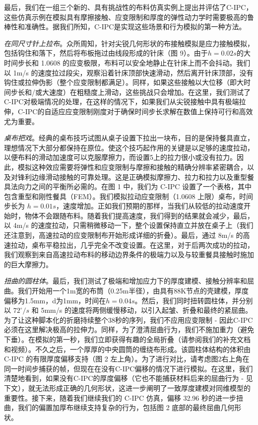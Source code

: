 最后，我们在一组三个新的、具有挑战性的布料仿真实例上提出并评估了C-IPC，这些仿真示例在模拟具有摩擦接触、应变限制和厚度的弹性动力学时需要极高的鲁棒性和准确性。据我们所知，C-IPC是实现这些场景和行为模拟的第一种方法。

\textit{在同尺寸针上拉布}。众所周知，针对尖锐几何形状的布接触模拟是应力接触模拟，包括钩住和落下，然后将布板拖过由线段形成的针床（图 9）。由于$h = 0.02s$的大时间步长和 1.0608 的应变极限，布料可以安全地静止在针床上而不会抖动。我们以 1m/s 的速度拉过段尖，观察沿着针床顶部快速滑动，然后离开针床顶部，没有钩住或拉伸伪影（整个应变限制都满足）。同样，如果这些接触以大位移（即大时间步长和/或大速度）在粗糙度上滑动，这些挑战只会增加。在这里，我们测试了C-IPC对极端情况的处理，在这样的情况下，如果我们从尖锐接触中具有极端拉伸，C-IPC的自适应应变限制刚度对于确保时间步长求解在数值上保持可行和高效尤为重要。

\textit{桌布把戏}。经典的桌布技巧试图从桌子设置下拉出一块布，目的是保持餐具直立，理想情况下大部分都保持在原位。使这个技巧起作用的关键是以足够的速度拉动，以便布料的滑动加速度可以克服摩擦力，而设置5上的拉力很小或没有拉力。因此，模拟这种效应需要将弹性和应变限制与摩擦和接触的精确分辨率紧密耦合，以及对锋利边缘滑动接触的可靠处理。这是正确模拟摩擦力、拉力和拉力以及重型餐具法向力之间的平衡所必需的。在图 1 中，我们为 C-IPC 设置了一个表格，其中包含重型和刚性餐具（FEM）。我们模拟拉动应变限制（1.0608 上限）桌布，时间步长为 $h = 0.01s$，速度增加。正如我们预期的那样，当我们从较低的拉动速度开始时，物体不会跟随布料。随着我们提高速度，我们得到的结果就会减少，最后，以 4m/s 的速度拉动，只需稍微移动一下，整个设置保持直立并放在桌子上（我们还注意到，高速拉动的应变限制布开始形成详细的折叠）。最后，通过 8m/s 的高速拉动，桌布平稳拉出，几乎完全不改变设置。在这里，对于后两次成功的拉动，我们观察到来自高速拉动布料的移动边界条件的极端力以及与较重餐具接触时施加的巨大摩擦力。

\textit{扭曲的圆柱体}。最后，我们测试了极端和增加应力下的厚度建模、接触分辨率和屈曲。我们开始用一个1m宽的布筒（0.25m半径），由具有88K节点的壳建模，厚度偏移为1.5mm，d为1mm，时间在$h = 0.04s$。然后，我们同时扭转圆柱体，并分别以 $72^{\circ}/s$ 和 5mm/s 的速度将两侧缓慢移动，以引入起皱、折叠和最终的紧屈曲。为了让这种脚本化的折磨持续整个38秒的序列，我们不应用应变限制 - 因此C-IPC必须在这里解决极高的拉伸力。同样，为了澄清屈曲行为，我们不施加重力（避免下垂）。在模拟的第一秒，我们立即获得有趣的全局折叠（请参阅我们的补充文档和视频）。不久之后，一个厚厚的中央圆筒的缠绕布形成。该圆柱体结构的体积由 C-IPC 的有限厚度偏移支持（图 2 左上角）。为了进行对比，请考虑图2右上角在同一时间步捕获的帧，但现在在没有C-IPC偏移的情况下进行模拟。在这里，我们清楚地看到，如果没有C-IPC的厚度偏移（它也不能捕获材料后来的屈曲行为 - 见下文），就无法形成正确的几何形状，这进一步阐明了一致厚度建模对同维模型的重要性。接下来，随着我们继续我们的 C-IPC 仿真，偏移 32.96 秒的进一步扭曲，我们的偏置加厚布继续支持复杂的行为，包括图 2 底部的最终屈曲几何形状。
